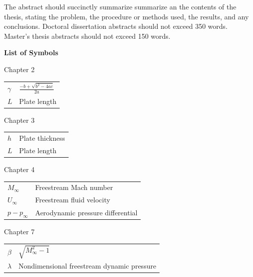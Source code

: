 \documentclass[12pt]{report}
\begin{document}
%
The abstract should succinctly summarize summarize an the contents of the thesis, stating the problem, the procedure or methods used, the results, and any conclusions.  Doctoral dissertation abstracts should not exceed 350 words.  Master's thesis abstracts should not exceed 150 words.
%
\newpage
\begin{singlespace}\begin{center}
  \textbf{\Huge{List of Symbols}}
\end{center}

\begin{flushleft}{\large Chapter 2} \end{flushleft}
\begin{tabular}{p{0.75in}l}
   $\gamma$ & $\frac{-b+\sqrt{b^{2}-4ac}}{2a}$\\
   $L$ & {Plate length}\\
\end{tabular}

\begin{flushleft}{\large Chapter 3} \end{flushleft}
\begin{tabular}{p{0.75in}l}
   $h$ & {Plate thickness}\\
   $L$ & {Plate length}\\
\end{tabular}

\begin{flushleft}{\large Chapter 4} \end{flushleft}
\begin{tabular}{p{0.75in}l}
   $M_{\infty}$ & {Freestream Mach number}\\
   $U_{\infty}$ & {Freestream fluid velocity}\\
   $p-p_\infty$ & {Aerodynamic pressure differential}\\
\end{tabular}

\begin{flushleft} {\large Chapter 7} \end{flushleft}
\begin{tabular}{p{0.75in}l}
   $\beta$   & $\sqrt{M_{\infty}^2-1}$\\
   $\lambda$ & {Nondimensional freestream dynamic pressure}\\
\end{tabular}
%
\end{singlespace}
\end{document}
